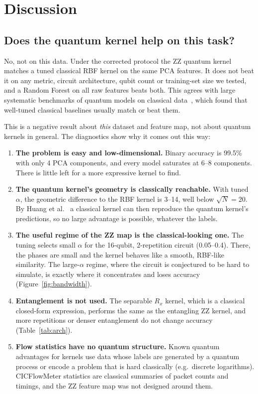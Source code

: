 \section{Discussion}
\label{sec:discussion}

\subsection{Does the quantum kernel help on this task?}
No, not on this data. Under the corrected protocol the ZZ quantum kernel matches a tuned
classical RBF kernel on the same PCA features. It does not beat it on any metric, circuit
architecture, qubit count or training-set size we tested, and a Random Forest on all raw
features beats both. This agrees with large systematic benchmarks of quantum models on classical
data~\cite{bowles2024}, which found that well-tuned classical baselines usually match or beat
them.

This is a negative result about \emph{this} dataset and feature map, not about quantum kernels in
general. The diagnostics show why it comes out this way:
\begin{enumerate}
\item \textbf{The problem is easy and low-dimensional.} Binary accuracy is 99.5\% with only 4 PCA
      components, and every model saturates at 6--8 components. There is little left for a more
      expressive kernel to find.
\item \textbf{The quantum kernel's geometry is classically reachable.} With tuned $\alpha$, the
      geometric difference to the RBF kernel is 3--14, well below $\sqrt{N}=20$. By
      Huang et al.~\cite{huang2021} a classical kernel can then reproduce the quantum kernel's
      predictions, so no large advantage is possible, whatever the labels.
\item \textbf{The useful regime of the ZZ map is the classical-looking one.} The tuning selects
      small $\alpha$ for the 16-qubit, 2-repetition circuit (0.05--0.4). There, the phases are small and the kernel behaves
      like a smooth, RBF-like similarity. The large-$\alpha$ regime, where the circuit is
      conjectured to be hard to simulate, is exactly where it concentrates and loses accuracy
      (Figure~\ref{fig:bandwidth}).
\item \textbf{Entanglement is not used.} The separable $R_x$ kernel, which is a classical closed-form
      expression, performs the same as the entangling ZZ kernel, and more repetitions or denser
      entanglement do not change accuracy (Table~\ref{tab:arch}).
\item \textbf{Flow statistics have no quantum structure.} Known quantum advantages for kernels use
      data whose labels are generated by a quantum process or encode a problem that is hard
      classically (e.g.\ discrete logarithms). CICFlowMeter statistics are classical summaries of
      packet counts and timings, and the ZZ feature map was not designed around them.
\end{enumerate}

